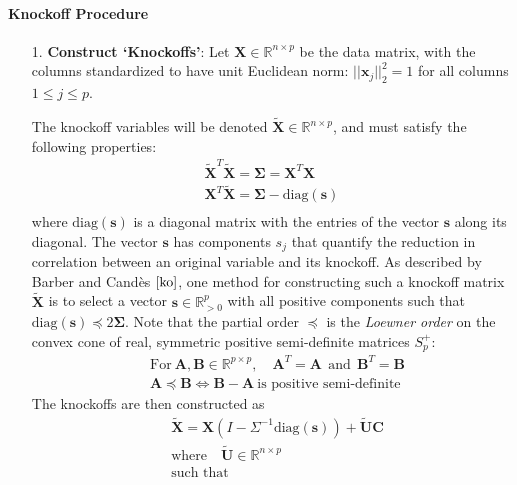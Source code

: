 \documentclass[]{scrartcl}
\newcommand{\1}[1]{\mathbbm{1}_{\left\{#1\right\}}}
\begin{document}
\paragraph{Knockoff Procedure}
\begin{itemize}
	\item[1.] \textbf{Construct `Knockoffs'}: Let $\mathbf{\mathbf{X}} \in \mathbb{R}^{n \times p}$ be the data matrix, with the columns standardized to have unit Euclidean norm: $||\mathbf{x}_{j}||_{2}^{2} = 1$ for all columns $1 \leq j \leq p$. 
	
	The knockoff variables will be denoted $\widetilde{\mathbf{\mathbf{X}}} \in \mathbb{R}^{n \times p}$, and must satisfy the following properties:
	\begin{align*}
		\widetilde{\mathbf{\mathbf{X}}}^{T}\widetilde{\mathbf{\mathbf{X}}} = \pmb\Sigma = \mathbf{\mathbf{X}}^{T}\mathbf{\mathbf{X}}\\
		\mathbf{\mathbf{X}}^{T}\widetilde{\mathbf{\mathbf{X}}} = \pmb\Sigma - \text{diag}(\mathbf{s})\\		
	\end{align*}
	where $\text{diag}(\mathbf{s})$ is a diagonal matrix with the entries of the vector $\mathbf{s}$ along its diagonal. The vector $\mathbf{s}$ has components $s_{j}$ that quantify the reduction in correlation between an original variable and its knockoff. As described by Barber and Cand\`es $\cite{ko}$, one method for constructing such a knockoff matrix $\widetilde{\mathbf{X}}$ is to select a vector $\mathbf{s} \in \mathbb{R}^{p}_{>0}$ with all positive components such that $\text{diag}(\mathbf{s}) \preceq 2\pmb\Sigma$. Note that the partial order $\preceq$ is the \textit{Loewner order} on the convex cone of real, symmetric positive semi-definite matrices $S^{+}_{p}$:
	\begin{align*}
		&\text{For}\ \mathbf{A}, \mathbf{B} \in \mathbb{R}^{p \times p}, \quad \mathbf{A}^{T} = \mathbf{A}\ \ \text{and}\ \ \mathbf{B}^{T} = \mathbf{B}\\
		&\mathbf{A} \preceq \mathbf{B} \iff \mathbf{B} - \mathbf{A} \ \text{is positive semi-definite}
	\end{align*}
	The knockoffs are then constructed as
	\begin{align*}
		& \widetilde{\mathbf{\mathbf{X}}} = \mathbf{\mathbf{X}}(I - \Sigma^{-1}\text{diag}(\mathbf{s})) + \widetilde{\mathbf{U}}\mathbf{C}\\
		&\text{where}\quad \widetilde{\mathbf{U}} \in \mathbb{R}^{n \times p}\\ 
		&\text{such that}\ \

\end{align*}
\end{itemize}
\end{document}
